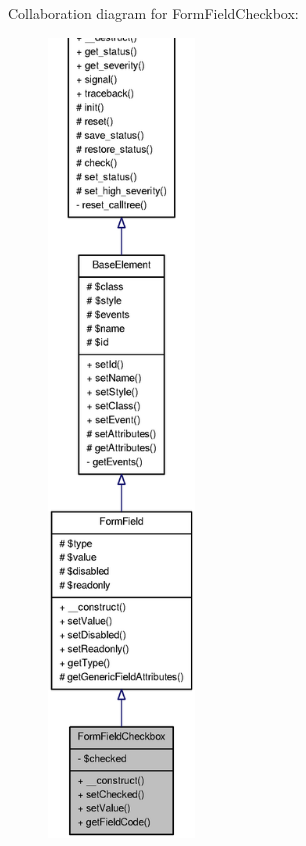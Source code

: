 Collaboration diagram for FormFieldCheckbox:\nopagebreak
\begin{figure}[H]
\begin{center}
\leavevmode
\includegraphics[height=600pt]{classFormFieldCheckbox__coll__graph}
\end{center}
\end{figure}
